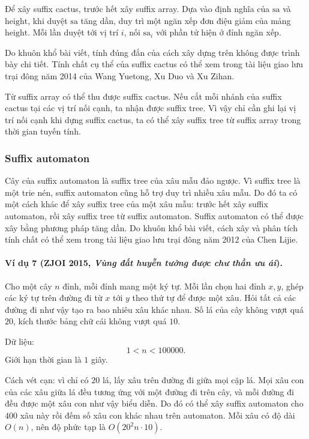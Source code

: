 \documentclass[11pt]{article}
\begin{document}
Để xây suffix cactus, trước hết xây suffix array. Dựa vào định nghĩa của
\(\mathrm{sa}\) và \(\mathrm{height}\), khi duyệt \(\mathrm{sa}\) tăng dần, duy
trì một ngăn xếp đơn điệu giảm của mảng \(\mathrm{height}\). Mỗi lần duyệt tới
vị trí \(i\), nối \(\mathrm{sa}_i\) với phần tử hiện ở đỉnh ngăn xếp.

Do khuôn khổ bài viết, tính đúng đắn của cách xây dựng trên không được trình bày
chi tiết. Tính chất cụ thể của suffix cactus có thể xem trong tài liệu giao lưu
trại đông năm 2014 của Wang Yuetong, Xu Duo và Xu Zihan.

Từ suffix array có thể thu được suffix cactus. Nếu cắt mỗi nhánh của suffix
cactus tại các vị trí nối cạnh, ta nhận được suffix tree. Vì vậy chỉ cần ghi lại
vị trí nối cạnh khi dựng suffix cactus, ta có thể xây suffix tree từ suffix array
trong thời gian tuyến tính.

\subsubsection{Suffix automaton}

Cây của suffix automaton là suffix tree của xâu mẫu đảo ngược. Vì suffix tree là
một trie nén, suffix automaton cũng hỗ trợ duy trì nhiều xâu mẫu. Do đó ta có
một cách khác để xây suffix tree của một xâu mẫu: trước hết xây suffix automaton,
rồi xây suffix tree từ suffix automaton. Suffix automaton có thể được xây bằng
phương pháp tăng dần. Do khuôn khổ bài viết, cách xây và phân tích tính chất có
thể xem trong tài liệu giao lưu trại đông năm 2012 của Chen Lijie.

\paragraph{Ví dụ 7 (ZJOI 2015, \emph{Vùng đất huyễn tưởng được chư thần ưu ái}).}
Cho một cây \(n\) đỉnh, mỗi đỉnh mang một ký tự. Mỗi lần chọn hai đỉnh \(x,y\),
ghép các ký tự trên đường đi từ \(x\) tới \(y\) theo thứ tự để được một xâu. Hỏi
tất cả các đường đi như vậy tạo ra bao nhiêu xâu khác nhau. Số lá của cây không
vượt quá \(20\), kích thước bảng chữ cái không vượt quá \(10\).

Dữ liệu:
\[
  1<n<100000.
\]
Giới hạn thời gian là \(1\) giây.

Cách vét cạn: vì chỉ có \(20\) lá, lấy xâu trên đường đi giữa mọi cặp lá. Mọi
xâu con của các xâu giữa lá đều tương ứng với một đường đi trên cây, và mỗi
đường đi đều được một xâu con như vậy biểu diễn. Do đó có thể xây suffix
automaton cho \(400\) xâu này rồi đếm số xâu con khác nhau trên automaton. Mỗi
xâu có độ dài \(O(n)\), nên độ phức tạp là \(O(20^2n\cdot 10)\).
\end{document}
